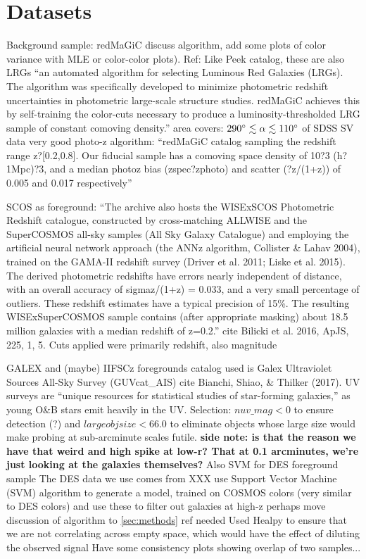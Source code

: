 \documentclass[11pt, oneside]{article}   	%
\begin{document}
\section{Datasets}\label{sec:data}

\begin{outline}
\1 Background sample: redMaGiC 
	\2 discuss algorithm, add some plots of color variance with MLE or color-color plots). Ref: 
	\2 Like Peek catalog, these are also LRGs
		\3 ``an automated algorithm for selecting Luminous Red Galaxies (LRGs). The algorithm was specifically developed 
			to minimize photometric redshift uncertainties in photometric large-scale structure studies. 
			redMaGiC achieves this by self-training the color-cuts necessary to produce a luminosity-thresholded LRG sample of constant comoving density.''
	\2 area covers: $290\degree \lesssim \alpha \lesssim 110\degree$ of SDSS SV data 
	\2 very good photo-z algorithm: ``redMaGiC catalog sampling the redshift range z?[0.2,0.8]. 
		Our fiducial sample has a comoving space density of 10?3 (h?1Mpc)?3, and a median photoz bias (zspec?zphoto) 
		and scatter (?z/(1+z)) of 0.005 and 0.017 respectively''
	
\1 SCOS as foreground:
	\2``The archive also hosts the WISExSCOS Photometric Redshift catalogue, constructed by cross-matching ALLWISE and the SuperCOSMOS 
		all-sky samples (All Sky Galaxy Catalogue) and employing the artificial neural network approach (the ANNz algorithm, Collister \& Lahav 2004), trained on the 
		GAMA-II redshift survey (Driver et al. 2011; Liske et al. 2015). The derived photometric redshifts have errors nearly independent of distance, 
		with an overall accuracy of sigmaz/(1+z) = 0.033, and a very small percentage of outliers. These redshift estimates have a typical precision of 15\%. 
		The resulting WISExSuperCOSMOS sample contains (after appropriate masking) about 18.5 million galaxies with a median redshift of z=0.2.''
	\2 cite Bilicki et al. 2016, ApJS, 225, 1, 5.
	\2 Cuts applied were primarily redshift, also magnitude 
	
\1 GALEX and (maybe) IIFSCz foregrounds
	\2 catalog used is Galex Ultraviolet Sources All-Sky Survey (GUVcat\_AIS)
		\3 cite Bianchi, Shiao, \& Thilker (2017).
	\2 UV surveys are ``unique resources for statistical studies of star-forming galaxies,'' as young O\&B stars emit heavily in the UV.
	\2 Selection: $nuv\_mag < 0$ to ensure detection (?) and $largeobjsize < 66.0$ to eliminate objects whose large size would make probing at sub-arcminute scales futile.
		\3 \textbf{side note: is that the reason we have that weird and high spike at low-r? That at 0.1 arcminutes, we're just looking at the galaxies themselves?}
\1 Also SVM for DES foreground sample 
	\2 The DES data we use comes from XXX
	\2 use Support Vector Machine (SVM) algorithm to generate a model, trained on COSMOS colors (very similar to DES colors) and use these
		to filter out galaxies at high-z	
		\3 perhaps move discussion of algorithm to \ref{sec:methods}
		\3 ref needed
\1 Used Healpy to ensure that we are not correlating across empty space, which would have the effect of diluting the observed signal
	\2 Have some consistency plots showing overlap of two samples...
\end{outline}
\end{document}
